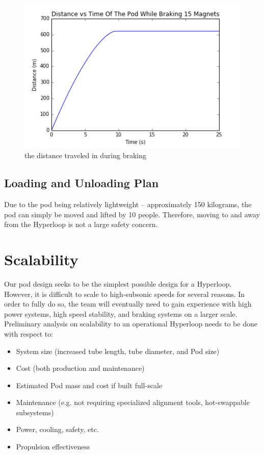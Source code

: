 \documentclass[main.tex]{subfiles}
\begin{document}
    \begin{figure}
        \centering
        \includegraphics[width=\linewidth]{images/distance_time_graph}
        \caption{the distance traveled in during braking}
        \label{fig:distance-profile}
    \end{figure}

\subsection{Loading and Unloading Plan}
Due to the pod being relatively lightweight – approximately 150 kilograms, the pod can simply be moved and lifted by 10 people. Therefore, moving to and away from the Hyperloop is not a large safety concern.

\section{Scalability}
Our pod design seeks to be the simplest possible design for a Hyperloop. However, it is difficult to scale to high-subsonic speeds for several reasons.
In order to fully do so, the team will eventually need to gain experience with high power systems, high speed stability, and braking systems on a larger scale.\\

Preliminary analysis on scalability to an operational Hyperloop needs to be done with respect to:
\begin{itemize}
    \item System size (increased tube length, tube diameter, and Pod size)
    \item Cost (both production and maintenance)
    \item Estimated Pod mass and cost if built full-scale
    \item Maintenance (e.g. not requiring specialized alignment tools, hot-swappable subsystems)
    \item Power, cooling, safety, etc.
    \item Propulsion effectiveness
\end{itemize}
\end{document}

